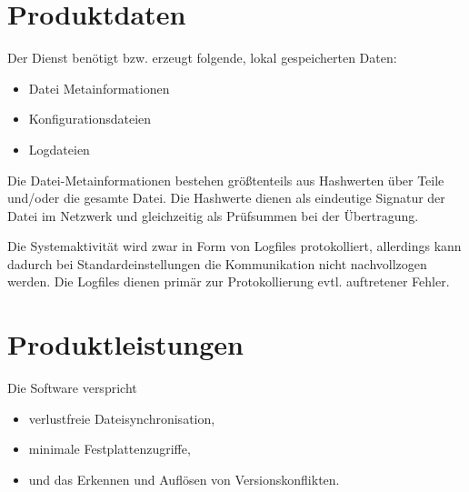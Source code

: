 \documentclass[12pt,oneside,a4paper,bibtotoc,liststotoc,pointlessnumbers]{scrartcl}
\begin{document}
\section{Produktdaten}
Der Dienst benötigt bzw. erzeugt folgende, lokal gespeicherten Daten:
\begin{itemize}
    \item Datei Metainformationen
    \item Konfigurationsdateien
    \item Logdateien 
\end{itemize}
Die Datei-Metainformationen bestehen größtenteils aus Hashwerten über Teile und/oder die gesamte Datei.
Die Hashwerte dienen als eindeutige Signatur der Datei im Netzwerk und gleichzeitig als Prüfsummen bei der
Übertragung.\par
Die Systemaktivität wird zwar in Form von Logfiles protokolliert, allerdings kann dadurch
bei Standardeinstellungen die Kommunikation nicht nachvollzogen werden. Die Logfiles dienen
primär zur Protokollierung evtl. auftretener Fehler.
\newpage
\section{Produktleistungen}
Die Software verspricht
\begin{itemize}
    \item verlustfreie Dateisynchronisation,
    \item minimale Festplattenzugriffe,
    \item und das Erkennen und Auflösen von Versionskonflikten.
\end{itemize}
\newpage
\end{document}
